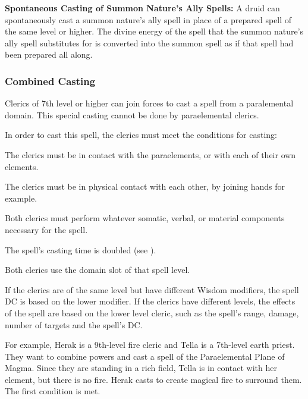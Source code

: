 \textbf{Spontaneous Casting of Summon Nature's Ally Spells:} A druid can spontaneously cast a summon nature's ally spell in place of a prepared spell of the same level or higher. The divine energy of the spell that the summon nature's ally spell substitutes for is converted into the summon spell as if that spell had been prepared all along.

\subsubsection{Combined Casting}
Clerics of 7th level or higher can join forces to cast a spell from a paralemental domain. This special casting cannot be done by paraelemental clerics.

In order to cast this spell, the clerics must meet the conditions for casting:
\begin{itemize*}
\item The clerics must be in contact with the paraelements, or with each of their own elements.
\item The clerics must be in physical contact with each other, by joining hands for example.
\item Both clerics must perform whatever somatic, verbal, or material components necessary for the spell.
\item The spell's casting time is doubled (see ).
\item Both clerics use the domain slot of that spell level.
\end{itemize*}


If the clerics are of the same level but have different Wisdom modifiers, the spell DC is based on the lower modifier. If the clerics have different levels, the effects of the spell are based on the lower level cleric, such as the spell's range, damage, number of targets and the spell's DC.

For example, Herak is a 9th-level fire cleric and Tella is a 7th-level earth priest. They want to combine powers and cast a spell of the Paraelemental Plane of Magma. Since they are standing in a rich field, Tella is in contact with her element, but there is no fire. Herak casts  to create magical fire to surround them. The first condition is met.

